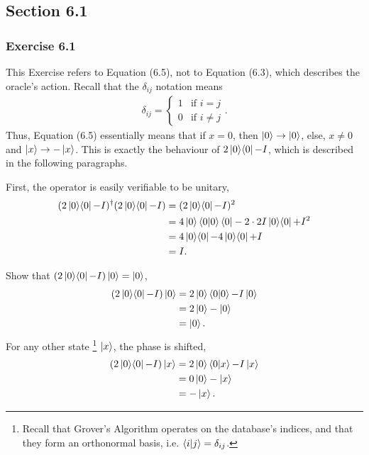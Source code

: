 \subsection{Section 6.1}

\subsubsection{Exercise 6.1}
This Exercise refers to Equation (6.5),
not to Equation (6.3), which describes the oracle's action.
Recall that the $\delta_{ij}$ notation means
\begin{align}
    \delta_{ij} = \begin{cases}
        1 & \text{if\ } i = j \\
        0 & \text{if\ } i \neq j
    \end{cases}.
\end{align}
Thus, Equation (6.5) essentially means that if
$x = 0$, then $\ket0 \rightarrow \ket0$, else,
$x \neq 0$ and $\ket x \rightarrow - \ket x$.
This is exactly the behaviour of $2 \mathop{\mathinner{ |{0}\rangle \langle{0}|}} - I$,
which is described in the following paragraphs.

First, the operator is easily verifiable to be unitary,
\begin{align}
    (2 \mathop{\mathinner{ |{0}\rangle \langle{0}|}} - I)^\dagger (2 \mathop{\mathinner{ |{0}\rangle \langle{0}|}} - I) &=
        (2 \mathop{\mathinner{ |{0}\rangle \langle{0}|}} - I)^2 \\
    &= 4 \ket0 \mathop{\mathinner{ \langle{0}|{0}\rangle}} \bra0 - 2 \cdot 2 I \mathop{\mathinner{ |{0}\rangle \langle{0}|}} + I^2 \\
    &= 4 \mathop{\mathinner{ |{0}\rangle \langle{0}|}} - 4 \mathop{\mathinner{ |{0}\rangle \langle{0}|}} + I \\
    &= I.
\end{align}

Show that $(2 \mathop{\mathinner{ |{0}\rangle \langle{0}|}} - I) \ket0 = \ket0$,
\begin{align}
    (2 \mathop{\mathinner{ |{0}\rangle \langle{0}|}} - I) \ket0 &= 2 \ket{0} \mathop{\mathinner{ \langle{0}|{0}\rangle}} - I \ket{0} \\
    &= 2 \ket0 - \ket0 \\
    &= \ket 0.
\end{align}
For any other state
    \footnote{Recall that Grover's Algorithm operates on the database's indices,
    and that they form an orthonormal basis, i.e. $\mathop{\mathinner{ \langle{i}|{j}\rangle}} = \delta_{ij}$.}
$\ket x$, the phase is shifted,
\begin{align}
    (2 \mathop{\mathinner{ |{0}\rangle \langle{0}|}} - I) \ket x &= 2 \ket{0} \mathop{\mathinner{ \langle{0}|{x}\rangle}} - I \ket{x} \\
    &= 0 \ket0 - \ket{x} \\
    &= - \ket{x}.
\end{align}

